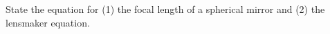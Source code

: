 

\vspace*{\fill}
\centering

State the equation for (1) the focal length of a spherical mirror and (2) the lensmaker equation.

\centering
\vspace*{\fill}

